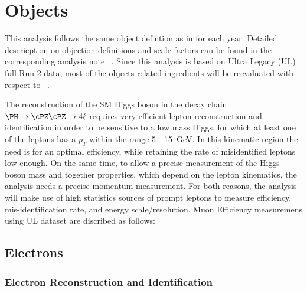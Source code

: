 \section{Objects}
\label{sec:objects}
This analysis follows the same object defintion as in \cite{CMS:2019chr} for each year. Detailed descricption on objection definitions and scale factors can be found in the corresponding analysis note ~\cite{CMS-PAS-HIG-19-001}. Since this analysis is based on Ultra Legacy (UL) full Run 2 data, most of the objects related ingredients will be reevaluated with respect to ~\cite{CMS-PAS-HIG-19-001}.     

The reconstruction of the SM Higgs boson in the decay chain $\HZZfl$ requires very efficient lepton reconstruction and identification in order to be sensitive
to a low mass Higgs, for which at least one of the leptons has a $p_T$ within the range 5 - 15~GeV. In this kinematic region the need is for an optimal
efficiency, while retaining the rate of misidentified leptons low enough. On the same time, to allow a precise measurement of the Higgs boson mass and together
properties, which depend on the lepton kinematics, the analysis needs a precise momentum measurement. For both reasons, the analysis will make use of high
statistics sources of prompt leptons to measure efficiency, mis-identification rate, and energy scale/resolution. Muon Efficiency measuremens using UL dataset are discribed as follows:

%
\subsection{Electrons}

\subsubsection{Electron Reconstruction and Identification}
\label{sec:eleReco}

%
%
%
%
%
